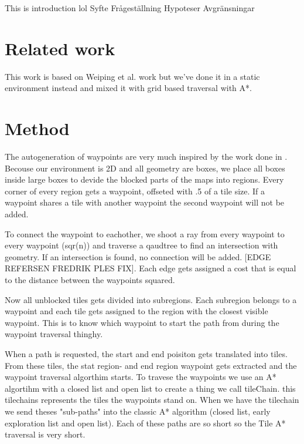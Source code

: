 \documentclass[a4paper]{article}
\begin{document}
This is introduction lol \newline
Syfte \newline
Frågeställning \newline
Hypoteser \newline
Avgränsningar

\section{Related work}
This work is based on Weiping et al. \cite{dynaPF15} work but we've done it in a static environment instead and mixed it with grid based traversal with A*.

\section{Method}
The autogeneration of waypoints are very much inspired by the work done in \cite{dynaPF15}. Becouse our environment is 2D and all geometry are boxes, we place all boxes inside large boxes to devide the blocked parts of the maps into regions. Every corner of every region gets a waypoint, offseted with .5 of a tile size. If a waypoint shares a tile with another waypoint
the second waypoint will not be added.
	
To connect the waypoint to eachother, we shoot a ray from every waypoint to every waypoint (sqr(n)) and traverse a qaudtree to find an intersection with geometry. If an intersection is found, no connection will be added. [EDGE REFERSEN FREDRIK PLES FIX]. Each edge gets assigned a cost that is equal to the distance between the waypoints squared.

Now all unblocked tiles gets divided into subregions. Each subregion belongs to a waypoint and each tile gets assigned to the region with the closest visible waypoint. This is to know which waypoint to start the path from during the waypoint traversal thinghy.

When a path is requested, the start and end poisiton gets translated into tiles. From these tiles, the stat region- and end region waypoint gets extracted and the waypoint traversal algorthim starts. To travese the waypoints we use an A* algortihm with a closed list and open list to create a thing we call tileChain. this tilechains represents the tiles the waypoints stand on.
When we have the tilechain we send theses "sub-paths" into the classic A* algorithm (closed list, early exploration list and open list). Each of these paths are so short so the Tile A* traversal is very short.
\end{document}
